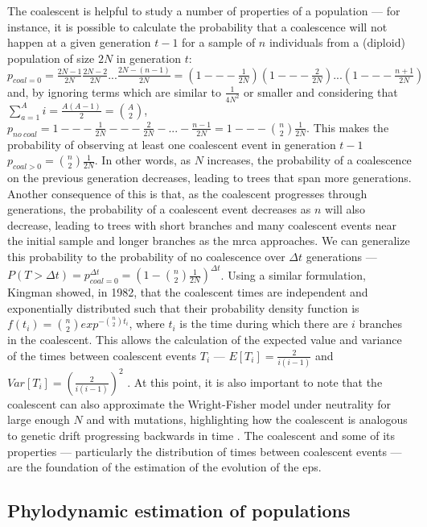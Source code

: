 The coalescent is helpful to study a number of properties of a population --- for instance, it is possible to calculate the probability that a coalescence will not happen at a given generation $t-1$ for a sample of $n$ individuals from a (diploid) population of size $2N$ in generation $t$: $p_{coal=0} = \frac{2N-1}{2N}\frac{2N-2}{2N}...\frac{2N-(n-1)}{2N} = (1 --- \frac{1}{2N})(1 --- \frac{2}{2N})...(1 --- \frac{n+1}{2N})$ and, by ignoring terms which are similar to $\frac{1}{4N^2}$ or smaller and considering that $\sum^A_{a=1}{i} = \frac{A(A-1)}{2} = \binom{A}{2}$, $p_{no\ coal} = 1 --- \frac{1}{2N} --- \frac{2}{2N} -...- \frac{n-1}{2N} = 1 --- \binom{n}{2}\frac{1}{2N}$. This makes the probability of observing at least one coalescent event in generation $t-1$ $p_{coal>0} = \binom{n}{2}\frac{1}{2N}$. In other words, as $N$ increases, the probability of a coalescence on the previous generation decreases, leading to trees that span more generations. Another consequence of this is that, as the coalescent progresses through generations, the probability of a coalescent event decreases as $n$ will also decrease, leading to trees with short branches and many coalescent events near the initial sample and longer branches as the \ac{mrca} approaches. We can generalize this probability to the probability of no coalescence over $\Delta t$ generations --- $P(T > \Delta t) = p_{coal=0}^{\Delta t} = (1-\binom{n}{2}\frac{1}{2N})^{\Delta t}$. Using a similar formulation, Kingman showed, in 1982, that the coalescent times are independent and exponentially distributed such that their probability density function is $f(t_i) = \binom{n}{2}exp^{-\binom{n}{2}t_i}$, where $t_i$ is the time during which there are $i$ branches in the coalescent. This allows the calculation of the expected value and variance of the times between coalescent events $T_i$ --- $E[T_i] = \frac{2}{i(i-1)}$ and $Var[T_i] = (\frac{2}{i(i-1)})^2$ \cite{Kingman1982-tc}. At this point, it is also important to note that the coalescent can also approximate the Wright-Fisher model under neutrality for large enough $N$ and with mutations, highlighting how the coalescent is analogous to genetic drift progressing backwards in time \cite{Wakeley2008-wh}. The coalescent and some of its properties --- particularly the distribution of times between coalescent events --- are the foundation of the estimation of the evolution of the \ac{eps}.

\subsection{Phylodynamic estimation of populations}

